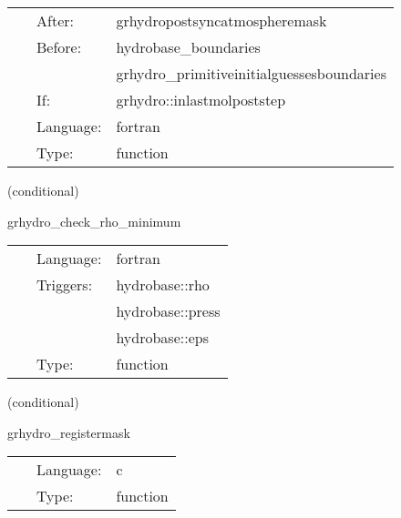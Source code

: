 \hspace{5mm}

 \begin{tabular*}{160mm}{cll} 
~ & After:  & grhydropostsyncatmospheremask \\ 
~ & Before:  & hydrobase\_boundaries \\ 
~& ~ &grhydro\_primitiveinitialguessesboundaries\\ 
~ & If:  & grhydro::inlastmolpoststep \\ 
~ & Language:  & fortran \\ 
~ & Type:  & function \\ 
\end{tabular*} 


\vspace{5mm}

   (conditional) 

\hspace{5mm} grhydro\_check\_rho\_minimum 



\hspace{5mm}

 \begin{tabular*}{160mm}{cll} 
~ & Language:  & fortran \\ 
~ & Triggers:  & hydrobase::rho \\ 
~& ~ &hydrobase::press\\ 
~& ~ &hydrobase::eps\\ 
~ & Type:  & function \\ 
\end{tabular*} 


\vspace{5mm}

   (conditional) 

\hspace{5mm} grhydro\_registermask 

\hspace{5mm}{\it register the hydro masks } 


\hspace{5mm}

 \begin{tabular*}{160mm}{cll} 
~ & Language:  & c \\ 
~ & Type:  & function \\ 
\end{tabular*} 


